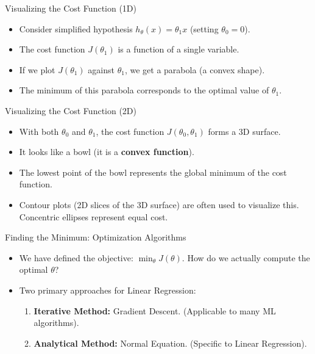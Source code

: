 \documentclass[aspectratio=169]{beamer}
\begin{document}
\begin{frame}{Visualizing the Cost Function (1D)}
\begin{itemize}
    \item Consider simplified hypothesis $h_\theta(x) = \theta_1 x$ (setting $\theta_0 = 0$).
    \item The cost function $J(\theta_1)$ is a function of a single variable.
    \item If we plot $J(\theta_1)$ against $\theta_1$, we get a parabola (a convex shape).
    \item The minimum of this parabola corresponds to the optimal value of $\theta_1$.
\end{itemize}
\end{frame}

\begin{frame}{Visualizing the Cost Function (2D)}
\begin{itemize}
    \item With both $\theta_0$ and $\theta_1$, the cost function $J(\theta_0, \theta_1)$ forms a 3D surface.
    \item It looks like a bowl (it is a \textbf{convex function}).
    \item The lowest point of the bowl represents the global minimum of the cost function.
    \item Contour plots (2D slices of the 3D surface) are often used to visualize this. Concentric ellipses represent equal cost.
\end{itemize}
\end{frame}

\begin{frame}{Finding the Minimum: Optimization Algorithms}
\begin{itemize}
    \item We have defined the objective: $\min_\theta J(\theta)$. How do we actually compute the optimal $\theta$?
    \item Two primary approaches for Linear Regression:
    \begin{enumerate}
        \item \textbf{Iterative Method:} Gradient Descent. (Applicable to many ML algorithms).
        \item \textbf{Analytical Method:} Normal Equation. (Specific to Linear Regression).
    \end{enumerate}
\end{itemize}
\end{frame}
\end{document}
